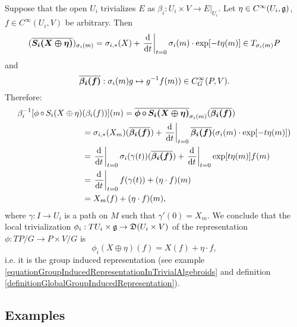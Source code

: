 \begin{example}[Local trivialization of representation of $TP/G$ on $E = P \times V/G$]\label{localTrivializationOfRepresentationOfAtiyahTPGonAssociated}
\label{exampleLocalTrivializationOfGroupInducedRepresentationOfAtiyahLieAlgebroidAction}
Suppose that the open $U_i$ trivializes $E$ as $\beta_i: U_i \times V\to E|_{U_i}$. Let $\eta \in C^\infty(U_i, \mathfrak{g})$, $f \in C^\infty(U_i, V)$ be arbitrary. Then
$$(\upsect{S_i(X \oplus \eta)})_{\sigma_i(m)} = \sigma_{i, *}(X) + \der{t}[t=0]{\sigma_i(m) \cdot \exp[-t \eta(m)]} \in T_{\sigma_i(m)} P$$
and
$$\overline{\bm{\beta_i(f)}}: \sigma_i(m)g \mapsto g^{-1} f(m)) \in C^\infty_G(P, V).$$
Therefore:
\begin{align*}
    \beta_i^{-1}[\phi\comp S_i(X \oplus \eta)&(\beta_i(f))] (m)
        = \upsect{\phi \comp S_i(X \oplus \eta)}_{\sigma_i(m)} (\upsect{\beta_i(f)})\\
        &= \sigma_{i, *}(X_m)(\upsect{\beta_i(f)}) 
        + \der{t}[t = 0]{\upsect{\beta_i(f)}(\sigma_i(m) \cdot \exp[-t \eta(m)])}\\
        &= \der{t}[t = 0]{\sigma_i(\gamma(t))} (\upsect{\beta_i(f)}) + \der{t}[t=0]{\exp[t \eta(m)] f(m)}\\
        &= \der{t}[t=0]{f(\gamma(t))} + (\eta \cdot f)(m)\\
        &= X_m(f) + (\eta \cdot f)(m),
\end{align*}
where $\gamma: I \to U_i$ is a path on $M$ such that $\gamma'(0) = X_m$. We conclude that the local trivialization $\phi_i: TU_i \times \alg g \to \alg D(U_i \times V)$ of the representation $\phi: TP/G \to P \times V/G$ is
\begin{equation}\label{equationLocalRepresentationAtiyahLieAlgebroidOnAssociatedVectorBundleExpectedTrivialALgebroidRepresentationActionOfGroup}
    \phi_i(X \oplus \eta)(f) = X(f) + \eta \cdot f,
\end{equation}
i.e. it is the group induced representation (see example \ref{equationGroupInducedRepresentationInTrivialAlgebroids} and definition \ref{definitionGlobalGroupInducedRepresentation}).
\end{example}




\subsection{Examples}
\label{chBasicSubsectionLocalDescriptionExamples}

